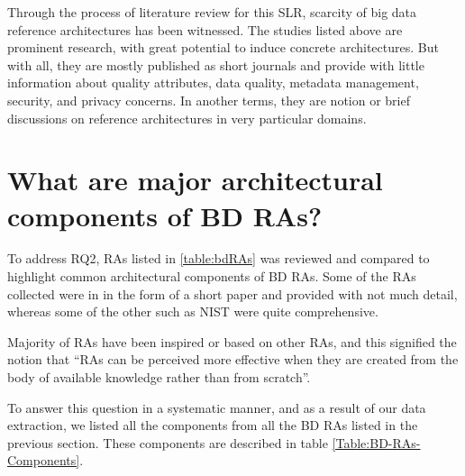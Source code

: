 \documentclass[review]{elsarticle}
\begin{document}
Through the process of literature review for this SLR, scarcity of big data reference architectures has been witnessed. The studies listed above are prominent research, with great potential to induce concrete architectures. But with all, they are mostly published as short journals and provide with little information about quality attributes, data quality, metadata management, security, and privacy concerns. In another terms, they are notion or brief discussions on reference architectures in very particular domains.

\section{What are major architectural components of BD RAs? }

To address RQ2, RAs listed in \ref{table:bdRAs} was reviewed and compared to highlight common architectural components of BD RAs. Some of the RAs collected were in in the form of a short paper and provided with not much detail, whereas some of the other such as NIST were quite comprehensive. 

Majority of RAs have been inspired or based on other RAs, and this signified the notion that “RAs can be perceived more effective when they are created from the body of available knowledge rather than from scratch”.

To answer this question in a systematic manner, and as a result of our data extraction, we listed all the components from all the BD RAs listed in the previous section. These components are described in table \ref{Table:BD-RAs-Components}.
\end{document}
